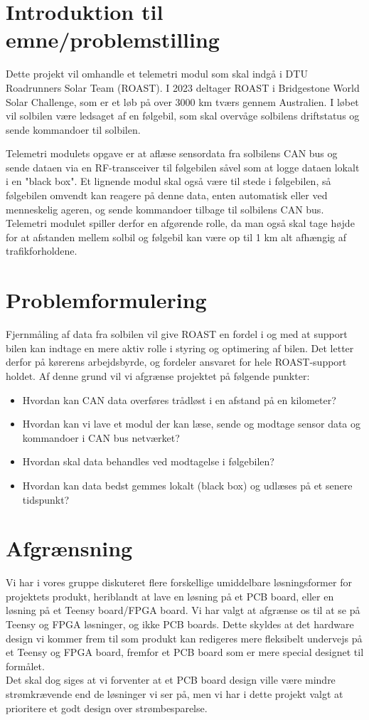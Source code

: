 \documentclass[]{article}
\begin{document}
\section{Introduktion til emne/problemstilling}

Dette projekt vil omhandle et telemetri modul som skal indgå i DTU Roadrunners Solar Team (ROAST). I 2023 deltager ROAST i Bridgestone World Solar Challenge, som er et løb på over 3000 km tværs gennem Australien. I løbet vil solbilen være ledsaget af en følgebil, som skal overvåge solbilens driftstatus og sende kommandoer til solbilen.


Telemetri modulets opgave er at aflæse sensordata fra solbilens CAN bus og sende dataen via en RF-transceiver til følgebilen såvel som at logge dataen lokalt i en "black box". Et lignende modul skal også være til stede i følgebilen, så følgebilen omvendt kan reagere på denne data, enten automatisk eller ved menneskelig ageren, og sende kommandoer tilbage til solbilens CAN bus. Telemetri modulet spiller derfor en afgørende rolle, da man også skal tage højde for at afstanden mellem solbil og følgebil kan være op til 1 km alt afhængig af trafikforholdene.

\section{Problemformulering}
Fjernmåling af data fra solbilen vil give ROAST en fordel i og med at support bilen kan indtage en mere aktiv rolle i styring og optimering af bilen. Det letter derfor på kørerens arbejdsbyrde, og fordeler ansvaret for hele ROAST-support holdet. Af denne grund vil vi afgrænse projektet på følgende punkter: 
\begin{itemize}
    \item Hvordan kan CAN data overføres trådløst i en afstand på en kilometer?
    \item Hvordan kan vi lave et modul der kan læse, sende og modtage sensor data og kommandoer i CAN bus netværket?
    \item Hvordan skal data behandles ved modtagelse i følgebilen?
    \item Hvordan kan data bedst gemmes lokalt (black box) og udlæses på et senere tidspunkt?
\end{itemize}

\section{Afgrænsning}
Vi har i vores gruppe diskuteret flere forskellige umiddelbare løsningsformer for projektets produkt, heriblandt at lave en løsning på et PCB board, eller en løsning på et Teensy board/FPGA board. Vi har valgt at afgrænse os til at se på Teensy og FPGA løsninger, og ikke PCB boards. Dette skyldes at det hardware design vi kommer frem til som produkt kan redigeres mere fleksibelt undervejs på et Teensy og FPGA board, fremfor et PCB board som er mere special designet til formålet.\\
Det skal dog siges at vi forventer at et PCB board design ville være mindre strømkrævende end de løsninger vi ser på, men vi har i dette projekt valgt at prioritere et godt design over strømbesparelse.
\end{document}
